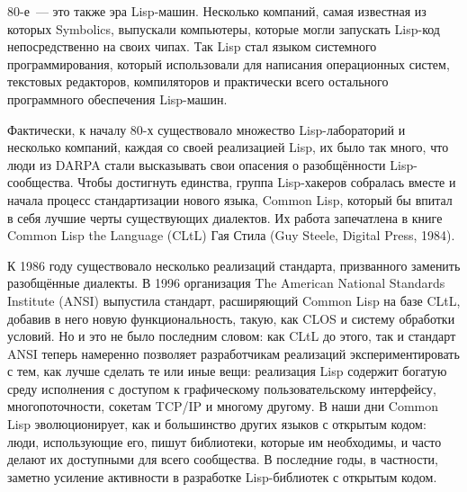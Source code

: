 80-е~--- это также эра Lisp-машин. Несколько компаний, самая известная из которых
Symbolics, выпускали компьютеры, которые могли запускать Lisp-код непосредственно на своих
чипах. Так Lisp стал языком системного программирования, который использовали для
написания операционных систем, текстовых редакторов, компиляторов и практически всего
остального программного обеспечения Lisp-ма\-шин.

Фактически, к началу 80-х существовало множество Lisp-ла\-бо\-ра\-то\-рий и несколько компаний,
каждая со своей реализацией Lisp, их было так много, что люди из DARPA стали высказывать
свои опасения о разобщённости Lisp-со\-об\-щест\-ва. Чтобы достигнуть единства, группа
Lisp-ха\-ке\-ров собралась вместе и начала процесс стандартизации нового языка, Common Lisp,
который бы впитал в себя лучшие черты существующих диалектов. Их работа запечатлена в
книге Common Lisp the Language (CLtL) Гая Стила (Guy Steele, Digital Press, 1984).

К 1986 году существовало несколько реализаций стандарта, призванного заменить разобщённые
диалекты. В 1996 организация The American National Standards Institute (ANSI) выпустила
стандарт, расширяющий Common Lisp на базе CLtL, добавив в него новую функциональность,
такую, как CLOS и систему обработки условий. Но и это не было последним словом: как CLtL
до этого, так и стандарт ANSI теперь намеренно позволяет разработчикам реализаций
экспериментировать с тем, как лучше сделать те или иные вещи: реализация Lisp содержит
богатую среду исполнения с доступом к графическому пользовательскому интерфейсу,
многопоточности, сокетам TCP/IP и многому другому. В наши дни Common Lisp эволюционирует,
как и большинство других языков с открытым кодом: люди, использующие его, пишут
библиотеки, которые им необходимы, и часто делают их доступными для всего сообщества. В
последние годы, в частности, заметно усиление активности в разработке Lisp-би\-бли\-о\-тек 
с открытым кодом.

